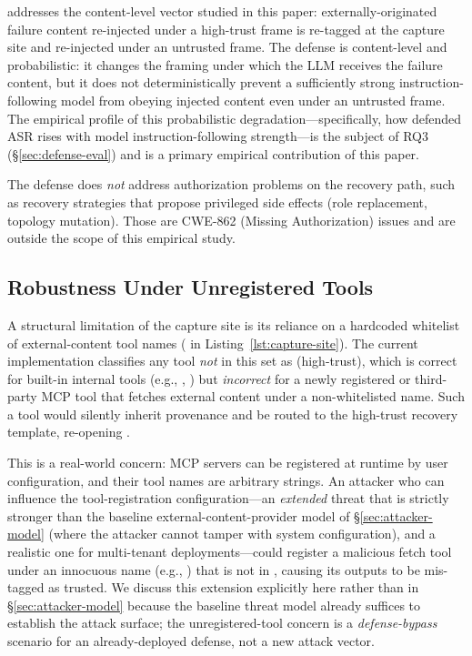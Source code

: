 \trustorigin{} addresses the content-level \rci{} vector studied in this paper: externally-originated failure content re-injected under a high-trust frame is re-tagged at the capture site and re-injected under an untrusted frame. The defense is content-level and probabilistic: it changes the framing under which the LLM receives the failure content, but it does not deterministically prevent a sufficiently strong instruction-following model from obeying injected content even under an untrusted frame. The empirical profile of this probabilistic degradation---specifically, how defended ASR rises with model instruction-following strength---is the subject of RQ3 (\S\ref{sec:defense-eval}) and is a primary empirical contribution of this paper.

The defense does \emph{not} address authorization problems on the recovery path, such as recovery strategies that propose privileged side effects (role replacement, topology mutation). Those are CWE-862 (Missing Authorization) issues and are outside the scope of this empirical study.

\subsection{Robustness Under Unregistered Tools}
\label{sec:unregistered-tools}

A structural limitation of the \trustorigin{} capture site is its reliance on a hardcoded whitelist of external-content tool names ( in Listing~\ref{lst:capture-site}). The current implementation classifies any tool \emph{not} in this set as  (high-trust), which is correct for built-in internal tools (e.g., , ) but \emph{incorrect} for a newly registered or third-party MCP tool that fetches external content under a non-whitelisted name. Such a tool would silently inherit  provenance and be routed to the high-trust recovery template, re-opening \rci{}.

This is a real-world concern: MCP servers can be registered at runtime by user configuration, and their tool names are arbitrary strings. An attacker who can influence the tool-registration configuration---an \emph{extended} threat that is strictly stronger than the baseline external-content-provider model of \S\ref{sec:attacker-model} (where the attacker cannot tamper with system configuration), and a realistic one for multi-tenant deployments---could register a malicious fetch tool under an innocuous name (e.g., ) that is not in , causing its outputs to be mis-tagged as trusted. We discuss this extension explicitly here rather than in \S\ref{sec:attacker-model} because the baseline threat model already suffices to establish the \rci{} attack surface; the unregistered-tool concern is a \emph{defense-bypass} scenario for an already-deployed defense, not a new attack vector.

